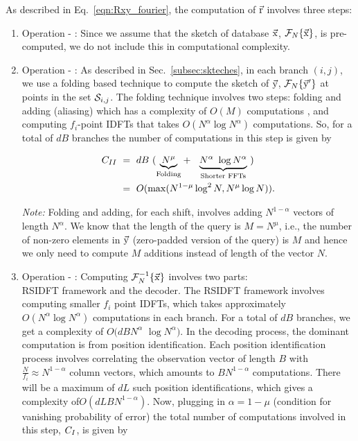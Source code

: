 As described in Eq.~\ref{eqn:Rxy_fourier}, the computation of $\vec{\mathrm{r}}$ involves three steps:
\begin{enumerate}
	\item  Operation - :
	Since we assume that the sketch of database $\vec{\mathrm{x}}$, $\mathcal{F}_{N}\{\vec{\mathrm{x}}\}$, is pre-computed, we do not include this in computational complexity.

	\item  Operation - :
	As described in Sec.~\ref{subsec:skteches}, in each branch $(i,j)$, we use a folding based technique to compute the sketch of $\vec{\mathrm{y}}$, $\mathcal{F}_{N}\{\vec{\mathrm{y}}'\}$ at points in the set $\mathcal{S}_{i,j}$. The folding technique involves two steps: folding and adding (aliasing) which has a complexity of $O(M)$ computations , and computing $f_i$-point IDFTs that takes $O(N^\alpha \log N^{\alpha})$ computations. So, for a total of $dB$ branches the number of computations in this step is given by
	
	\begin{align*}
	 C_{\RNum{2}} \ &= ~  dB ~
	( \underset{\text{Folding} }{\underbrace{N^{\mu}}} + \ \
	\underset{\text{Shorter FFTs} }{\underbrace{N^{\alpha} \ \log N^{\alpha}}} \ )\\
	&= ~O(\max(N^{1-\mu}\log^2 N ,N^{\mu}\log N)).
	\end{align*}
	
	{\textit{Note:}} Folding and adding, for each shift, involves adding $N^{1-\alpha}$ vectors of length $N^{\alpha}$. We know that the length of the query is $M =N^{\mu}$, i.e., the number of non-zero elements in $\vec{\mathrm{y}}$ (zero-padded version of the query) is $M$ and hence we only need to compute $M$ additions instead of length of the vector $N$.

	\item  Operation - :
	 Computing $\mathcal{F}_{N}^{-1}\{ \vec{\mathrm{x}} \}$ involves two parts:\\ RSIDFT framework and the decoder. The RSIDFT framework involves computing smaller $f_i$ point IDFTs, which takes approximately $O(N^{\alpha} \log N^{\alpha})$ computations in each branch. For a total of $dB$ branches, we get a complexity of $O(dB N^{\alpha}$ $\log N^{\alpha})$. In the decoding process, the dominant computation is from position identification. Each position identification process involves correlating the observation vector of length $B$ with $\frac{N}{f_i} \approx N^{1-\alpha}$ column vectors, which amounts to $B N^{1-\alpha}$ computations. There will be a maximum of $dL$ such position identifications, which gives a complexity of$O(dLBN^{1-\alpha} )$. Now, plugging in $\alpha = 1-\mu$ (condition for vanishing probability of error) the total number of computations involved in this step, $C_{\RNum{1}}$, is given by
	

\end{enumerate}
